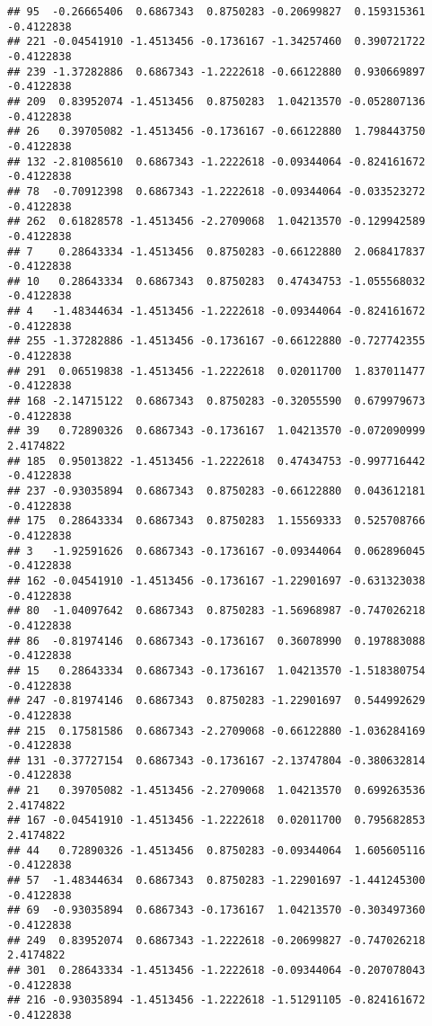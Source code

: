 \documentclass[
]{article}
\begin{document}
\begin{verbatim}
## 95  -0.26665406  0.6867343  0.8750283 -0.20699827  0.159315361 -0.4122838
## 221 -0.04541910 -1.4513456 -0.1736167 -1.34257460  0.390721722 -0.4122838
## 239 -1.37282886  0.6867343 -1.2222618 -0.66122880  0.930669897 -0.4122838
## 209  0.83952074 -1.4513456  0.8750283  1.04213570 -0.052807136 -0.4122838
## 26   0.39705082 -1.4513456 -0.1736167 -0.66122880  1.798443750 -0.4122838
## 132 -2.81085610  0.6867343 -1.2222618 -0.09344064 -0.824161672 -0.4122838
## 78  -0.70912398  0.6867343 -1.2222618 -0.09344064 -0.033523272 -0.4122838
## 262  0.61828578 -1.4513456 -2.2709068  1.04213570 -0.129942589 -0.4122838
## 7    0.28643334 -1.4513456  0.8750283 -0.66122880  2.068417837 -0.4122838
## 10   0.28643334  0.6867343  0.8750283  0.47434753 -1.055568032 -0.4122838
## 4   -1.48344634 -1.4513456 -1.2222618 -0.09344064 -0.824161672 -0.4122838
## 255 -1.37282886 -1.4513456 -0.1736167 -0.66122880 -0.727742355 -0.4122838
## 291  0.06519838 -1.4513456 -1.2222618  0.02011700  1.837011477 -0.4122838
## 168 -2.14715122  0.6867343  0.8750283 -0.32055590  0.679979673 -0.4122838
## 39   0.72890326  0.6867343 -0.1736167  1.04213570 -0.072090999  2.4174822
## 185  0.95013822 -1.4513456 -1.2222618  0.47434753 -0.997716442 -0.4122838
## 237 -0.93035894  0.6867343  0.8750283 -0.66122880  0.043612181 -0.4122838
## 175  0.28643334  0.6867343  0.8750283  1.15569333  0.525708766 -0.4122838
## 3   -1.92591626  0.6867343 -0.1736167 -0.09344064  0.062896045 -0.4122838
## 162 -0.04541910 -1.4513456 -0.1736167 -1.22901697 -0.631323038 -0.4122838
## 80  -1.04097642  0.6867343  0.8750283 -1.56968987 -0.747026218 -0.4122838
## 86  -0.81974146  0.6867343 -0.1736167  0.36078990  0.197883088 -0.4122838
## 15   0.28643334  0.6867343 -0.1736167  1.04213570 -1.518380754 -0.4122838
## 247 -0.81974146  0.6867343  0.8750283 -1.22901697  0.544992629 -0.4122838
## 215  0.17581586  0.6867343 -2.2709068 -0.66122880 -1.036284169 -0.4122838
## 131 -0.37727154  0.6867343 -0.1736167 -2.13747804 -0.380632814 -0.4122838
## 21   0.39705082 -1.4513456 -2.2709068  1.04213570  0.699263536  2.4174822
## 167 -0.04541910 -1.4513456 -1.2222618  0.02011700  0.795682853  2.4174822
## 44   0.72890326 -1.4513456  0.8750283 -0.09344064  1.605605116 -0.4122838
## 57  -1.48344634  0.6867343  0.8750283 -1.22901697 -1.441245300 -0.4122838
## 69  -0.93035894  0.6867343 -0.1736167  1.04213570 -0.303497360 -0.4122838
## 249  0.83952074  0.6867343 -1.2222618 -0.20699827 -0.747026218  2.4174822
## 301  0.28643334 -1.4513456 -1.2222618 -0.09344064 -0.207078043 -0.4122838
## 216 -0.93035894 -1.4513456 -1.2222618 -1.51291105 -0.824161672 -0.4122838

\end{verbatim}
\end{document}

